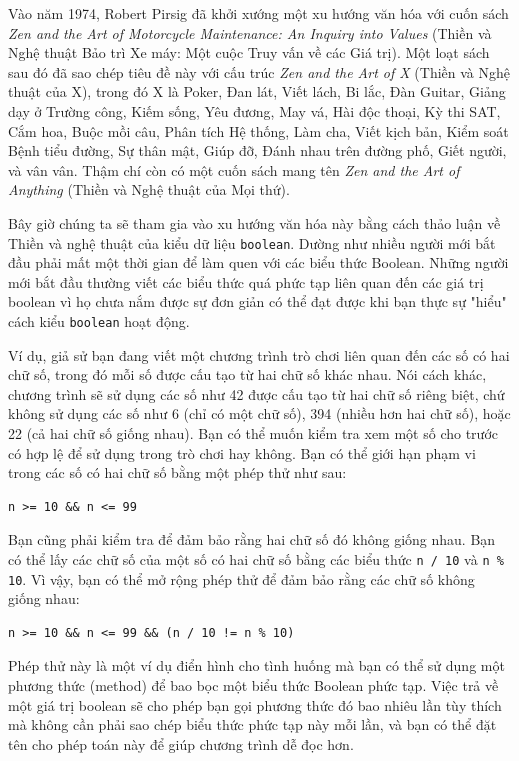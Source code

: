 Vào năm 1974, Robert Pirsig đã khởi xướng một xu hướng văn hóa với cuốn sách \textit{Zen and the Art of Motorcycle Maintenance: An Inquiry into Values} (Thiền và Nghệ thuật Bảo trì Xe máy: Một cuộc Truy vấn về các Giá trị). Một loạt sách sau đó đã sao chép tiêu đề này với cấu trúc \textit{Zen and the Art of X} (Thiền và Nghệ thuật của X), trong đó X là Poker, Đan lát, Viết lách, Bi lắc, Đàn Guitar, Giảng dạy ở Trường công, Kiếm sống, Yêu đương, May vá, Hài độc thoại, Kỳ thi SAT, Cắm hoa, Buộc mồi câu, Phân tích Hệ thống, Làm cha, Viết kịch bản, Kiểm soát Bệnh tiểu đường, Sự thân mật, Giúp đỡ, Đánh nhau trên đường phố, Giết người, và vân vân. Thậm chí còn có một cuốn sách mang tên \textit{Zen and the Art of Anything} (Thiền và Nghệ thuật của Mọi thứ).

Bây giờ chúng ta sẽ tham gia vào xu hướng văn hóa này bằng cách thảo luận về Thiền và nghệ thuật của kiểu dữ liệu \texttt{boolean}. Dường như nhiều người mới bắt đầu phải mất một thời gian để làm quen với các biểu thức Boolean. Những người mới bắt đầu thường viết các biểu thức quá phức tạp liên quan đến các giá trị boolean vì họ chưa nắm được sự đơn giản có thể đạt được khi bạn thực sự "hiểu" cách kiểu \texttt{boolean} hoạt động.

Ví dụ, giả sử bạn đang viết một chương trình trò chơi liên quan đến các số có hai chữ số, trong đó mỗi số được cấu tạo từ hai chữ số khác nhau. Nói cách khác, chương trình sẽ sử dụng các số như 42 được cấu tạo từ hai chữ số riêng biệt, chứ không sử dụng các số như 6 (chỉ có một chữ số), 394 (nhiều hơn hai chữ số), hoặc 22 (cả hai chữ số giống nhau). Bạn có thể muốn kiểm tra xem một số cho trước có hợp lệ để sử dụng trong trò chơi hay không. Bạn có thể giới hạn phạm vi trong các số có hai chữ số bằng một phép thử như sau:

\begin{verbatim}
n >= 10 && n <= 99
\end{verbatim}

Bạn cũng phải kiểm tra để đảm bảo rằng hai chữ số đó không giống nhau. Bạn có thể lấy các chữ số của một số có hai chữ số bằng các biểu thức \texttt{n / 10} và \texttt{n \% 10}. Vì vậy, bạn có thể mở rộng phép thử để đảm bảo rằng các chữ số không giống nhau:

\begin{verbatim}
n >= 10 && n <= 99 && (n / 10 != n % 10)
\end{verbatim}

Phép thử này là một ví dụ điển hình cho tình huống mà bạn có thể sử dụng một phương thức (method) để bao bọc một biểu thức Boolean phức tạp. Việc trả về một giá trị boolean sẽ cho phép bạn gọi phương thức đó bao nhiêu lần tùy thích mà không cần phải sao chép biểu thức phức tạp này mỗi lần, và bạn có thể đặt tên cho phép toán này để giúp chương trình dễ đọc hơn.

